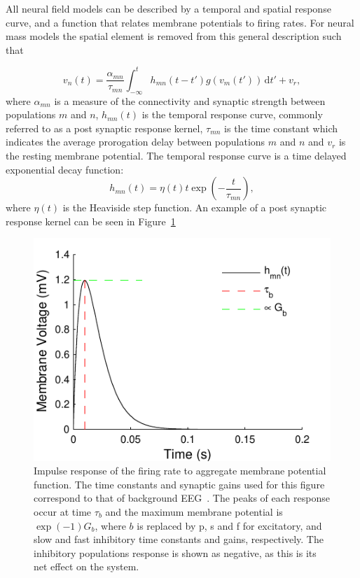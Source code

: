 \documentclass{article}%
\begin{document}
All neural field models can be described by a temporal and spatial response curve, and a function that relates membrane potentials to firing rates. For neural mass models the spatial element is removed from this general description such that

\begin{equation}\label{eq:conv_eq}
    v_n(t) = \frac{\alpha_{mn}}{\tau_{mn}}\int_{-\infty}^t  h_{mn}(t-t')g(v_m(t')) \,\mathrm{d}t' + v_r,
\end{equation}
where $\alpha_{mn}$ is a measure of the connectivity and synaptic strength between populations $m$ and $n$, $h_{mn}(t)$ is the temporal response curve, commonly referred to as a post synaptic response kernel, $\tau_{mn}$ is the time constant which indicates the average prorogation delay between populations $m$ and $n$ and $v_r$ is the resting membrane potential. The temporal response curve is a time delayed exponential decay function:
\begin{equation}
    h_{mn}(t) = \eta(t)t\exp\left(-\frac{t}{\tau_{mn}}\right),
\end{equation}
where $\eta(t)$ is the Heaviside step function. An example of a post synaptic response kernel can be seen in Figure~\ref{fig: FR2PSP_final}

  \begin{figure}%
	\centering
		\includegraphics{FR2PSPNaming.pdf}
	\caption{Impulse response of the firing rate to aggregate membrane potential function. The time constants and synaptic gains used for this figure correspond to that of background EEG~\citep{wendling2002epileptic}. The peaks of each response occur at time $\tau_{b}$ and the maximum membrane potential is $\exp(-1)G_{b}$, where $b$ is replaced by p, s and f for excitatory, and slow and fast inhibitory time constants and gains, respectively. The inhibitory populations response is shown as negative, as this is its net effect on the system.}
	\label{fig: FR2PSP_final}
\end{figure} %
\end{document}
